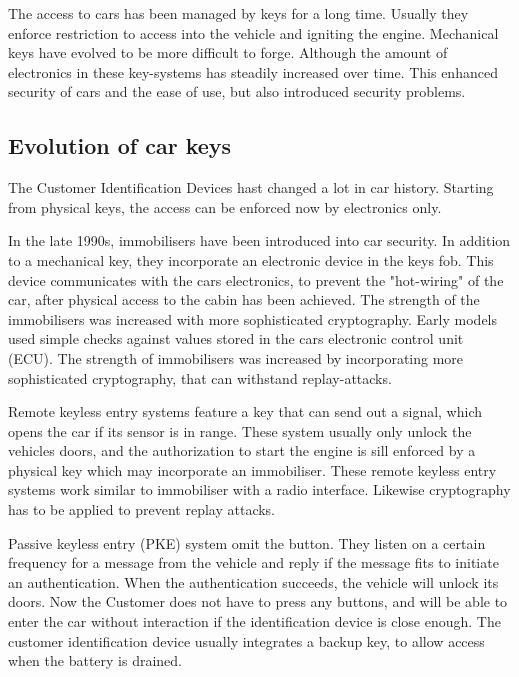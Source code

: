 The access to cars has been managed by keys for a long time. %
Usually they enforce restriction to access into the vehicle
and igniting the engine.
Mechanical keys have evolved to be more difficult to forge.
Although the amount of electronics in these key-systems has steadily increased over time.
This enhanced security of cars and the ease of use,
but also introduced security problems.

\subsection*{Evolution of car keys}
	The Customer Identification Devices hast changed a lot in car history.
	Starting from physical keys,
	the access can be enforced now by electronics only.

	In the late 1990s, immobilisers have been introduced into car security.
	In addition to a mechanical key, 
	they incorporate an electronic device in the keys fob.
	This device communicates with the cars electronics,
	to prevent the "hot-wiring" of the car,
	after physical access to the cabin has been achieved.
	The strength of the immobilisers was increased with more sophisticated cryptography.
	Early models used simple checks against values stored in the cars electronic control unit (ECU).
	The strength of immobilisers was increased by incorporating more
	sophisticated cryptography,
	that can withstand replay-attacks.	%

	Remote keyless entry systems feature a key that can send out a signal,
	which opens the car if its sensor is in range.
	These system usually only unlock the vehicles doors,
	and the authorization to start the engine is sill enforced by a physical key
	which may incorporate an immobiliser.
	These remote keyless entry systems work similar to immobiliser with a radio interface.
	Likewise cryptography has to be applied to prevent replay attacks.

	Passive keyless entry (PKE) system omit the button.
	They listen on a certain frequency for a message from the vehicle
	and reply if the message fits to initiate an authentication.
	When the authentication succeeds, the vehicle will unlock its doors.
	Now the Customer does not have to press any buttons,
	and will be able to enter the car without interaction 
	if the identification device is close enough.
	The customer identification device usually integrates a backup key,
	to allow access when the battery is drained.

